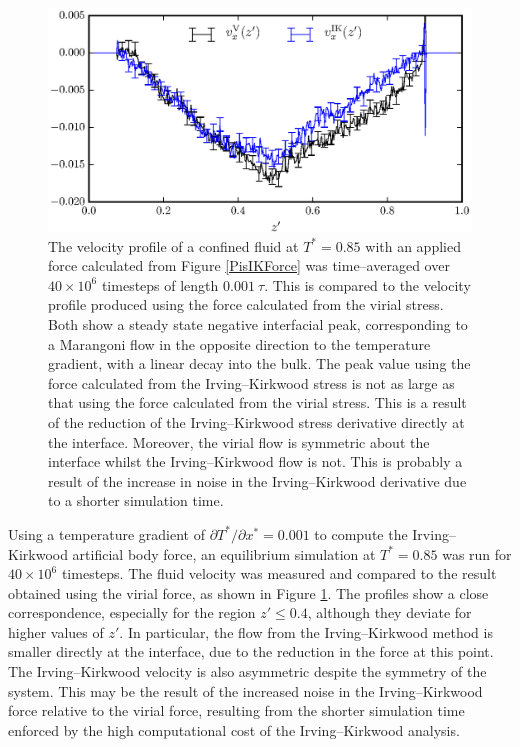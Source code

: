 \begin{figure}[h!]
\centering
\includegraphics[scale=1.0]{PisIKFlow}
\caption{The velocity profile of a confined fluid at $T^{*}=0.85$ with an applied force calculated from Figure \ref{PisIKForce} was time--averaged over $40 \times 10^{6}$ timesteps of length $0.001\ \tau$.
This is compared to the velocity profile produced using the force calculated from the virial stress.
Both show a steady state negative interfacial peak, corresponding to a Marangoni flow in the opposite direction to the temperature gradient, with a linear decay into the bulk.
The peak value using the force calculated from the Irving--Kirkwood stress is not as large as that using the force calculated from the virial stress.
This is a result of the reduction of the Irving--Kirkwood stress derivative directly at the interface.
Moreover, the virial flow is symmetric about the interface whilst the Irving--Kirkwood flow is not. 
This is probably a result of the increase in noise in the Irving--Kirkwood derivative due to a shorter simulation time.}
\label{PisIKFlow}
\end{figure}
Using a temperature gradient of $\partial T^{*} / \partial x^{*} = 0.001$ to compute the Irving--Kirkwood artificial body force, an equilibrium simulation at $T^{*} = 0.85$ was run for $40 \times 10^{6}$ timesteps.
The fluid velocity was measured and compared to the result obtained using the virial force, as shown in Figure \ref{PisIKFlow}.
The profiles show a close correspondence, especially for the region $z' \leq 0.4$, although they deviate for higher values of $z'$.
In particular, the flow from the Irving--Kirkwood method is smaller directly at the interface, due to the reduction in the force at this point.
The Irving--Kirkwood velocity is also asymmetric despite the symmetry of the system.
This may be the result of the increased noise in the Irving--Kirkwood force relative to the virial force, resulting from the shorter simulation time enforced by the high computational cost of the Irving--Kirkwood analysis.

